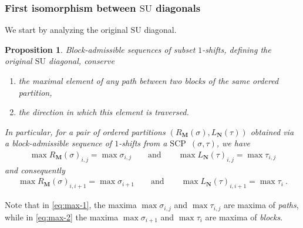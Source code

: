 \documentclass{amsart}
\newtheorem{proposition}[theorem]{Proposition}
\theoremstyle{definition}
\newcommand{\SU}{\mathrm{SU}}
\newcommand{\SCP}{\mathrm{SCP}}
\begin{document}

\subsubsection{First isomorphism between $\SU$ diagonals}

We start by analyzing the original $\SU$ diagonal.

\begin{proposition} 
\label{prop:SU-preserves-max}
Block-admissible sequences of subset $1$-shifts, defining the original $\SU$ diagonal, conserve 
\begin{enumerate}
\item the maximal element of any path between two blocks of the same ordered partition,
\item the direction in which this element is traversed. 
\end{enumerate}
In particular, for a pair of ordered partitions $(R_{\mathbf{M}}(\sigma),L_{\mathbf{N}}(\tau))$ obtained via a block-admissible sequence of $1$-shifts from a $\SCP$~$(\sigma,\tau)$, we have
\begin{align}
\label{eq:max-1}
\max R_{\mathbf{M}}(\sigma)_{i,j} = \max \sigma_{i,j} \qquad \text{and} \qquad \max L_{\mathbf{N}}(\tau)_{i,j} = \max \tau_{i,j} \tag{P}
\end{align}
and consequently
\begin{align}
\label{eq:max-2}
\max R_{\mathbf{M}}(\sigma)_{i,i+1} = \max \sigma_{i+1} \qquad \text{and}\qquad \max L_{\mathbf{N}}(\tau)_{i,i+1} = \max \tau_{i} \ . \tag{B}
\end{align}
\end{proposition}

Note that in \cref{eq:max-1}, the maxima $\max \sigma_{i,j}$ and $\max \tau_{i,j}$ are maxima of \emph{paths}, while in \cref{eq:max-2} the maxima $\max \sigma_{i+1}$ and $\max \tau_{i}$ are maxima of \emph{blocks}.
\end{document}
